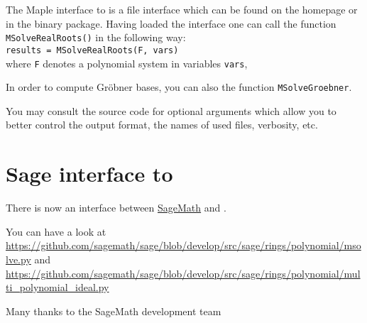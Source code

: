 \documentclass[a4paper,english,11pt]{scrartcl}
\theoremstyle{definition}
\theoremstyle{remark}
\begin{document}
The Maple interface to \msolve is a file interface which can be found on the
\msolve homepage or in the \msolve binary package. Having loaded the interface
one can call the function
\texttt{MSolveRealRoots()} in the following way:\\[1em]
\texttt{results = MSolveRealRoots(F, vars)}\\[1em]
where \texttt{F} denotes a polynomial system in variables \texttt{vars},


In order to compute Gr\"obner bases, you can also the function
\texttt{MSolveGroebner}. 

You may consult the source code for optional arguments which allow you to better
control the output format, the names of used files, verbosity, etc.

\section{Sage interface to \msolve}

There is now an interface between \href{https://www.sagemath.org/}{SageMath} 
and \msolve. 

You can have a look at 
\url{https://github.com/sagemath/sage/blob/develop/src/sage/rings/polynomial/msolve.py}
and 
\url{https://github.com/sagemath/sage/blob/develop/src/sage/rings/polynomial/multi_polynomial_ideal.py}

\hfill Many thanks to the SageMath development team

\end{document}
